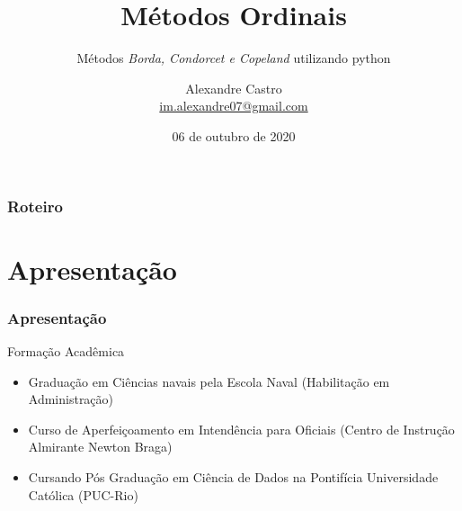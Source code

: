 \documentclass[aspectratio=169]{beamer}
\title[Métodos Ordinais]{Métodos Ordinais}
\subtitle{Métodos \textit{Borda, Condorcet e Copeland} utilizando python}
\begin{document}
\author[M. Alexandre P. C. Junior]{
    \begin{tabular}{c} 
        \Large
        Alexandre Castro\\
        \footnotesize \href{mailto:im.alexandre07@gmail.com}{im.alexandre07@gmail.com}
    \end{tabular}}


\date{06 de outubro de 2020}


\begin{frame}\maketitle\end{frame}


\begin{frame}
    \frametitle{Roteiro}
    \tableofcontents[pausesections]
\end{frame}

\section{Apresentação}
\begin{frame}
    \frametitle{Apresentação}
    Formação Acadêmica
    \begin{itemize}
        \item Graduação em Ciências navais pela Escola Naval (Habilitação em Administração)
        \item Curso de Aperfeiçoamento em Intendência para Oficiais (Centro de Instrução Almirante Newton Braga)
        \item Cursando Pós Graduação em Ciência de Dados na Pontifícia Universidade Católica (PUC-Rio)
    \end{itemize}

\end{frame}
\end{document}
